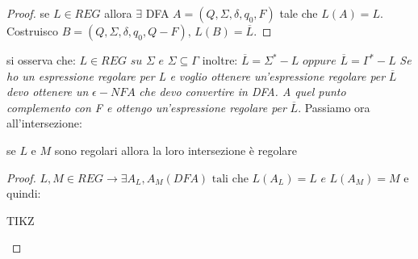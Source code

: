 \begin{proof}
	se $L\in REG$ allora $\exists$ DFA $A=(Q, \Sigma, \delta, q_0, F)$ tale che $L(A)=L$. Costruisco $B=(Q,\Sigma, \delta,q_0, Q-F),\,	 L(B)=\overline{L}$.
\end{proof}
si osserva che:
$L\in REG\,\,su\,\, \Sigma\,\,e\,\, \Sigma\subseteq \Gamma$
inoltre:
$\overline{L}=\Sigma^*-L\,\,oppure\,\, \overline{L}=\Gamma^*-L$
\textit{Se ho un espressione regolare per L e voglio ottenere un'espressione regolare per }$\overline{L}$\textit{ devo ottenere un }$\epsilon-NFA$\textit{ che devo convertire in DFA. A quel punto complemento con F e ottengo un'espressione regolare per }$\overline{L}$.
Passiamo ora all'intersezione:
\begin{theorem}
	se $L$ e $M$ sono regolari allora la loro intersezione è regolare
\end{theorem}
\begin{proof}
	$L,M\in REG\to \exists A_L,A_M(DFA) \text{ tali che }L(A_L)=L\,\,e\,\, L(A_M)=M$
	e quindi:
	\begin{center}
		TIKZ
	\end{center}
\end{proof}
